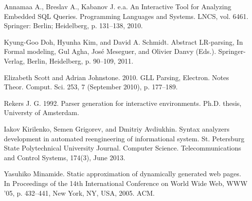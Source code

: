 \documentclass{acm_proc_article-sp}
\begin{document}
\begin{thebibliography}{}

Annamaa A., Breslav A., Kabanov J. e.a. An Interactive Tool for Analyzing Embedded SQL Queries. Programming Languages and Systems. LNCS, vol. 6461. Springer: Berlin; Heidelberg, p. 131--138, 2010.



Kyung-Goo Doh, Hyunha Kim, and David A. Schmidt. Abstract LR-parsing, In Formal modeling, Gul Agha, Jos{\'e} Meseguer, and Olivier Danvy (Eds.). Springer-Verlag, Berlin, Heidelberg, p. 90--109, 2011.


Elizabeth Scott and Adrian Johnstone. 2010. GLL Parsing, Electron. Notes Theor. Comput. Sci. 253, 7 (September 2010), p. 177--189. 

Rekers J. G. 1992. Parser generation for interactive environments. Ph.D. thesis, Universty of Amsterdam.


Iakov Kirilenko, Semen Grigorev, and Dmitriy Avdiukhin. Syntax analyzers development in automated reengineering of informational system.
St. Petersburg State Polytechnical University Journal. Computer Science. Telecommunications and Control Systems, 174(3), June 2013.

Yasuhiko Minamide. Static approximation of dynamically generated web pages. In Proceedings of the 14th International Conference on World
  Wide Web, WWW '05, p. 432--441, New York, NY, USA, 2005. ACM.


\end{thebibliography}
\end{document}

